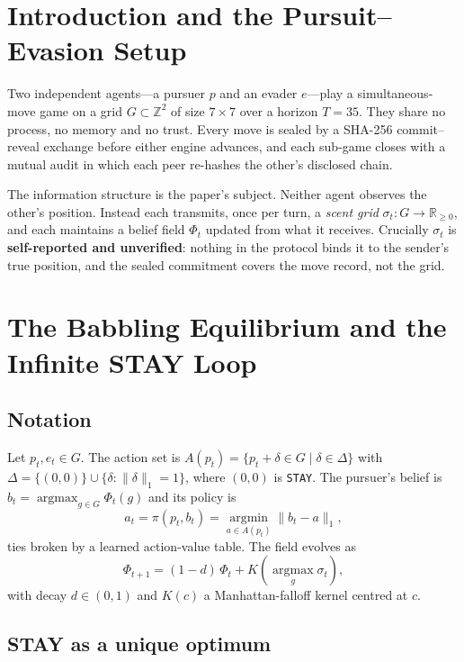 \documentclass[conference]{IEEEtran}
\begin{document}
\section{Introduction and the Pursuit--Evasion Setup}

Two independent agents---a pursuer $p$ and an evader $e$---play a
simultaneous-move game on a grid $G \subset \mathbb{Z}^2$ of size $7\times 7$
over a horizon $T = 35$. They share no process, no memory and no trust. Every
move is sealed by a SHA-256 commit--reveal exchange before either engine
advances, and each sub-game closes with a mutual audit in which each peer
re-hashes the other's disclosed chain.

The information structure is the paper's subject. Neither agent observes the
other's position. Instead each transmits, once per turn, a \emph{scent grid}
$\sigma_t : G \to \mathbb{R}_{\ge 0}$, and each maintains a belief field
$\Phi_t$ updated from what it receives. Crucially $\sigma_t$ is
\textbf{self-reported and unverified}: nothing in the protocol binds it to the
sender's true position, and the sealed commitment covers the move record, not
the grid.

\section{The Babbling Equilibrium and the Infinite STAY Loop}

\subsection{Notation}
Let $p_t, e_t \in G$. The action set is
$A(p_t) = \{p_t + \delta \in G \mid \delta \in \Delta\}$ with
$\Delta = \{(0,0)\} \cup \{\delta : \|\delta\|_1 = 1\}$, where $(0,0)$ is
\texttt{STAY}. The pursuer's belief is $b_t = \operatorname{argmax}_{g \in G}
\Phi_t(g)$ and its policy is
\begin{equation}
a_t = \pi(p_t, b_t) = \operatorname*{argmin}_{a \in A(p_t)} \|b_t - a\|_1 ,
\label{eq:policy}
\end{equation}
ties broken by a learned action-value table. The field evolves as
\begin{equation}
\Phi_{t+1} = (1-d)\,\Phi_t + K\!\left(\operatorname*{argmax}_{g}\sigma_t\right),
\label{eq:field}
\end{equation}
with decay $d \in (0,1)$ and $K(c)$ a Manhattan-falloff kernel centred at $c$.

\subsection{STAY as a unique optimum}
\end{document}
